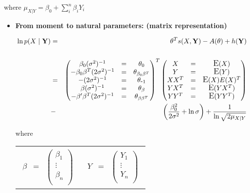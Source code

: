 \documentclass[11pt, oneside]{article}   	%
\DeclareMathOperator*{\E}{\mbox{\large E}}
\numberwithin{figure}{section}
\numberwithin{equation}{section}
\numberwithin{table}{section}
\begin{document}
\begin{itemize}
where $\mu_{X|Y} = \beta_0+\sum_i^n{\beta_i Y_i}$

\begin{itemize}
\item \textbf{From moment to natural parameters: (matrix representation)}


\begin{eqnarray*}
\ln p(X \mid \mathbf{Y}) &=& \theta^T s(X,\mathbf{Y}) - A(\theta) + h(\mathbf{Y})\\\\
&=&
\begin{pmatrix}
\beta_0 (\sigma^2)^{-1} &=& \theta_{0} \\
-\beta_0 \beta^T (2\sigma^2)^{-1} &=& \theta_{\beta_0 \beta^T} \\
-(2\sigma^2)^{-1} &=& \theta_{\mbox{-}1} \\
\beta (\sigma^2)^{-1} &=& \theta_{\beta} \\
-\beta' \beta^T (2\sigma^2)^{-1} &=& \theta_{\beta \beta^T} \\
\end{pmatrix}^T
\begin{pmatrix}
X   &=& \E(X)\\
Y   &=& \E(Y)\\
XX^T   &=& \E(X)E(X)^T\\
YX^T   &=& \E(YX^T)\\
YY^T   &=& \E(YY^T)\\
\end{pmatrix}
\\
&-& \left( \frac{\beta_0^2}{2\sigma^2} + \ln{\sigma}\right)  + \frac{1}{\ln{\sqrt{2\mu_{X|Y}}}}
\end{eqnarray*}

where

\begin{tabular}{p{4cm}p{4cm}}
\begin{eqnarray*}
\beta &=& 
\begin{pmatrix}
\beta_1\\
\vdots\\
\beta_n\\
\end{pmatrix}
\end{eqnarray*}
&
\begin{eqnarray*}
Y &=& 
\begin{pmatrix}
Y_1\\
\vdots\\
Y_n\\
\end{pmatrix}
\end{eqnarray*}
\\
\end{tabular}



\end{itemize}
\end{itemize}
\end{document}
